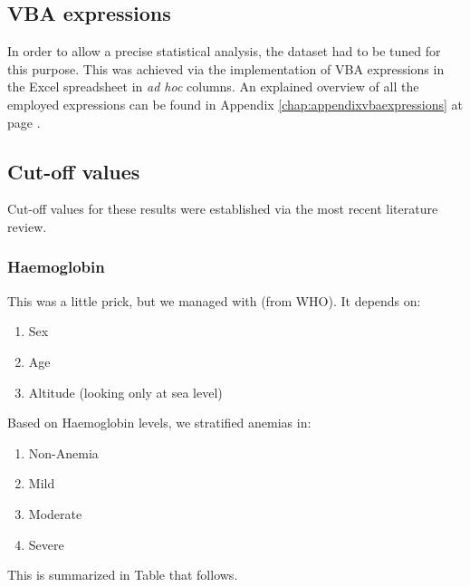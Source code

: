 
\subsection{VBA expressions}\label{sub:vbaexpressions}
In order to allow a precise statistical analysis, the dataset had to be tuned for this purpose. This was achieved via the implementation of VBA expressions in the Excel spreadsheet in \textit{ad hoc} columns. An explained overview of all the employed expressions can be found in Appendix \ref{chap:appendixvbaexpressions} at page \pageref{chap:appendixvbaexpressions}.

\subsection{Cut-off values}\label{sub:cutoffvalues}
Cut-off values for these results were established via the most recent literature review.



\subsubsection{Haemoglobin}\label{sub:haemoglobin}
This was a little prick, but we managed with \cite{Hbcutoff} (from WHO).
It depends on:
\begin{enumerate}
	\item Sex
	\item Age
	\item Altitude (looking only at sea level)
\end{enumerate}
Based on Haemoglobin levels, we stratified anemias in:
\begin{enumerate}
	\item Non-Anemia
	\item Mild
	\item Moderate
	\item Severe
\end{enumerate}
This is summarized in Table that follows.

